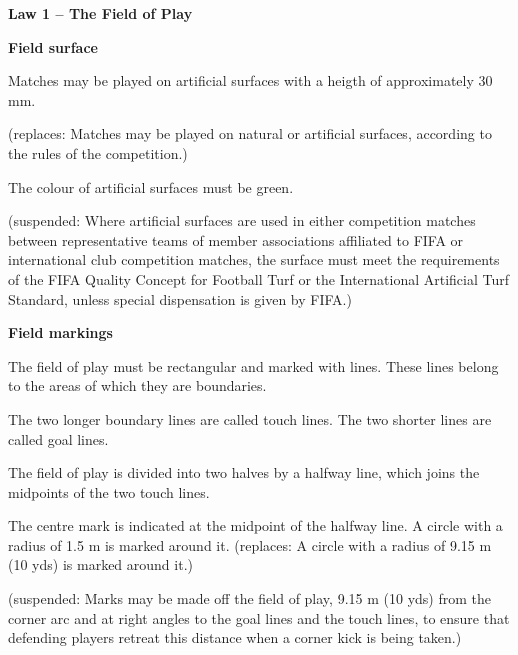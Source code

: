\sffamily
{\bfseries\color[rgb]{0.4,0.4,0.4}
Law 1 -- The Field of Play}

\bigskip
{\bfseries Field surface}

\headlinebox
 
Matches may be played on artificial surfaces with a heigth of approximately 30 mm.

{\color[rgb]{0.4,0.4,0.4}
(replaces: Matches may be played on natural or artificial surfaces, according to the rules of the competition.)}


\bigskip

{\sffamily
The colour of artificial surfaces must be green. }


\bigskip

{\color[rgb]{0.4,0.4,0.4}
(suspended: Where artificial surfaces are used in either competition matches between representative teams of member associations affiliated to FIFA or international club competition matches, the surface must meet the requirements of the FIFA Quality Concept for Football Turf or the International Artificial Turf Standard, unless special dispensation is given by FIFA.) }


\bigskip

{\bfseries
Field markings}

\headlinebox

The field of play must be rectangular and marked with lines. These lines belong to the areas of which they are boundaries.

\bigskip

The two longer boundary lines are called touch lines. The two shorter lines are called goal lines.

\bigskip

The field of play is divided into two halves by a halfway line, which joins the midpoints of the two touch lines.

\bigskip

The centre mark is indicated at the midpoint of the halfway line. A circle with a radius of 1.5 m is marked around it.
\textcolor[rgb]{0.4,0.4,0.4}{(replaces: A circle with a radius of 9.15 m (10 yds) is marked around it.)}

\bigskip

{\color[rgb]{0.4,0.4,0.4}
(suspended: Marks may be made off the field of play, 9.15 m (10 yds) from the corner arc and at right angles to the goal lines and the touch lines, to ensure that defending players retreat this distance when a corner kick is being taken.) }

